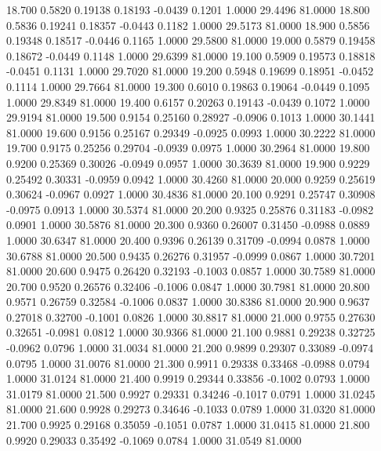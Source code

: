   18.700   0.5820   0.19138   0.18193  -0.0439   0.1201   1.0000  29.4496  81.0000
  18.800   0.5836   0.19241   0.18357  -0.0443   0.1182   1.0000  29.5173  81.0000
  18.900   0.5856   0.19348   0.18517  -0.0446   0.1165   1.0000  29.5800  81.0000
  19.000   0.5879   0.19458   0.18672  -0.0449   0.1148   1.0000  29.6399  81.0000
  19.100   0.5909   0.19573   0.18818  -0.0451   0.1131   1.0000  29.7020  81.0000
  19.200   0.5948   0.19699   0.18951  -0.0452   0.1114   1.0000  29.7664  81.0000
  19.300   0.6010   0.19863   0.19064  -0.0449   0.1095   1.0000  29.8349  81.0000
  19.400   0.6157   0.20263   0.19143  -0.0439   0.1072   1.0000  29.9194  81.0000
  19.500   0.9154   0.25160   0.28927  -0.0906   0.1013   1.0000  30.1441  81.0000
  19.600   0.9156   0.25167   0.29349  -0.0925   0.0993   1.0000  30.2222  81.0000
  19.700   0.9175   0.25256   0.29704  -0.0939   0.0975   1.0000  30.2964  81.0000
  19.800   0.9200   0.25369   0.30026  -0.0949   0.0957   1.0000  30.3639  81.0000
  19.900   0.9229   0.25492   0.30331  -0.0959   0.0942   1.0000  30.4260  81.0000
  20.000   0.9259   0.25619   0.30624  -0.0967   0.0927   1.0000  30.4836  81.0000
  20.100   0.9291   0.25747   0.30908  -0.0975   0.0913   1.0000  30.5374  81.0000
  20.200   0.9325   0.25876   0.31183  -0.0982   0.0901   1.0000  30.5876  81.0000
  20.300   0.9360   0.26007   0.31450  -0.0988   0.0889   1.0000  30.6347  81.0000
  20.400   0.9396   0.26139   0.31709  -0.0994   0.0878   1.0000  30.6788  81.0000
  20.500   0.9435   0.26276   0.31957  -0.0999   0.0867   1.0000  30.7201  81.0000
  20.600   0.9475   0.26420   0.32193  -0.1003   0.0857   1.0000  30.7589  81.0000
  20.700   0.9520   0.26576   0.32406  -0.1006   0.0847   1.0000  30.7981  81.0000
  20.800   0.9571   0.26759   0.32584  -0.1006   0.0837   1.0000  30.8386  81.0000
  20.900   0.9637   0.27018   0.32700  -0.1001   0.0826   1.0000  30.8817  81.0000
  21.000   0.9755   0.27630   0.32651  -0.0981   0.0812   1.0000  30.9366  81.0000
  21.100   0.9881   0.29238   0.32725  -0.0962   0.0796   1.0000  31.0034  81.0000
  21.200   0.9899   0.29307   0.33089  -0.0974   0.0795   1.0000  31.0076  81.0000
  21.300   0.9911   0.29338   0.33468  -0.0988   0.0794   1.0000  31.0124  81.0000
  21.400   0.9919   0.29344   0.33856  -0.1002   0.0793   1.0000  31.0179  81.0000
  21.500   0.9927   0.29331   0.34246  -0.1017   0.0791   1.0000  31.0245  81.0000
  21.600   0.9928   0.29273   0.34646  -0.1033   0.0789   1.0000  31.0320  81.0000
  21.700   0.9925   0.29168   0.35059  -0.1051   0.0787   1.0000  31.0415  81.0000
  21.800   0.9920   0.29033   0.35492  -0.1069   0.0784   1.0000  31.0549  81.0000
